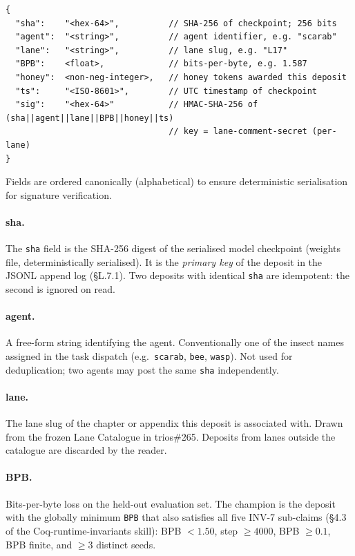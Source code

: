 \begin{verbatim}
{
  "sha":    "<hex-64>",          // SHA-256 of checkpoint; 256 bits
  "agent":  "<string>",          // agent identifier, e.g. "scarab"
  "lane":   "<string>",          // lane slug, e.g. "L17"
  "BPB":    <float>,             // bits-per-byte, e.g. 1.587
  "honey":  <non-neg-integer>,   // honey tokens awarded this deposit
  "ts":     "<ISO-8601>",        // UTC timestamp of checkpoint
  "sig":    "<hex-64>"           // HMAC-SHA-256 of (sha||agent||lane||BPB||honey||ts)
                                 // key = lane-comment-secret (per-lane)
}
\end{verbatim}

\noindent Fields are ordered canonically (alphabetical) to ensure
deterministic serialisation for signature verification.

\paragraph{sha.}
The \texttt{sha} field is the SHA-256 digest of the serialised model
checkpoint (weights file, deterministically serialised).  It is the
\emph{primary key} of the deposit in the JSONL append log (§L.7.1).
Two deposits with identical \texttt{sha} are idempotent: the second is
ignored on read.

\paragraph{agent.}
A free-form string identifying the agent.  Conventionally one of the
insect names assigned in the task dispatch (e.g.\ \texttt{scarab},
\texttt{bee}, \texttt{wasp}).  Not used for deduplication; two agents
may post the same \texttt{sha} independently.

\paragraph{lane.}
The lane slug of the chapter or appendix this deposit is associated
with.  Drawn from the frozen Lane Catalogue in trios\#265.  Deposits
from lanes outside the catalogue are discarded by the reader.

\paragraph{BPB.}
Bits-per-byte loss on the held-out evaluation set.  The champion is
the deposit with the globally minimum \texttt{BPB} that also satisfies
all five INV-7 sub-claims (§4.3 of the Coq-runtime-invariants skill):
BPB $< 1.50$, step $\geq 4000$, BPB $\geq 0.1$, BPB finite, and
$\geq 3$ distinct seeds.

